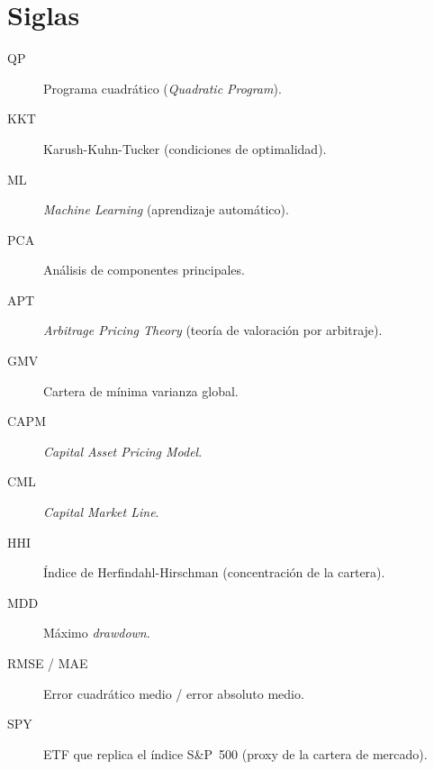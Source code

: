 \section*{Siglas}

\begin{description}
    \item[QP] Programa cuadrático (\textit{Quadratic Program}).
    \item[KKT] Karush-Kuhn-Tucker (condiciones de optimalidad).
    \item[ML] \textit{Machine Learning} (aprendizaje automático).
    \item[PCA] Análisis de componentes principales.
    \item[APT] \textit{Arbitrage Pricing Theory} (teoría de valoración por arbitraje).
    \item[GMV] Cartera de mínima varianza global.
    \item[CAPM] \textit{Capital Asset Pricing Model}.
    \item[CML] \textit{Capital Market Line}.
    \item[HHI] Índice de Herfindahl-Hirschman (concentración de la cartera).
    \item[MDD] Máximo \textit{drawdown}.
    \item[RMSE / MAE] Error cuadrático medio / error absoluto medio.
    \item[SPY] ETF que replica el índice S\&P~500 (proxy de la cartera de mercado).
\end{description}
